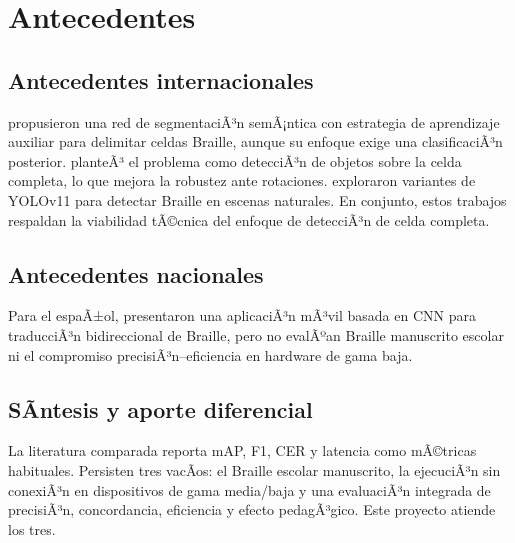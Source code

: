 \section{Antecedentes}

\subsection{Antecedentes internacionales}
\textcite{li2020} propusieron una red de segmentaciÃ³n semÃ¡ntica con estrategia de
aprendizaje auxiliar para delimitar celdas Braille, aunque su enfoque exige una
clasificaciÃ³n posterior. \textcite{ovodov2021} planteÃ³ el problema como detecciÃ³n
de objetos sobre la celda completa, lo que mejora la robustez ante rotaciones.
\textcite{sun2025} exploraron variantes de YOLOv11 para detectar Braille en
escenas naturales. En conjunto, estos trabajos respaldan la viabilidad tÃ©cnica
del enfoque de detecciÃ³n de celda completa.

\subsection{Antecedentes nacionales}
Para el espaÃ±ol, \textcite{fuentes2026} presentaron una aplicaciÃ³n mÃ³vil basada en
CNN para traducciÃ³n bidireccional de Braille, pero no evalÃºan Braille manuscrito
escolar ni el compromiso precisiÃ³n--eficiencia en hardware de gama baja.

\subsection{SÃ­ntesis y aporte diferencial}
La literatura comparada reporta mAP, F1, CER y latencia como mÃ©tricas habituales.
Persisten tres vacÃ­os: el Braille escolar manuscrito, la ejecuciÃ³n sin conexiÃ³n en
dispositivos de gama media/baja y una evaluaciÃ³n integrada de precisiÃ³n,
concordancia, eficiencia y efecto pedagÃ³gico. Este proyecto atiende los tres.
